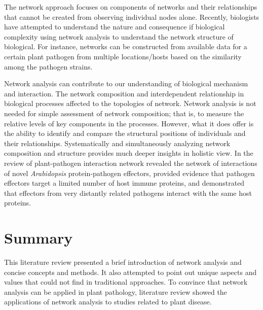 The network approach focuses on components of networks and their relationships that cannot be created from observing individual nodes alone. Recently, biologists have attempted to understand the nature and consequence if biological complexity using network analysis to understand the network structure of biological. For instance, networks can be constructed from available data for a certain plant pathogen from multiple locations/hosts based on the similarity among the pathogen strains.

Network analysis can contribute to our understanding of biological mechanism and interaction. The network composition and interdependent relationship in biological processes affected to the topologies of network. Network analysis is not needed for simple assessment of network composition; that is, to measure the relative levels of key components in the processes. However, what it does offer is the ability to identify and compare the structural positions of individuals and their relationships. Systematically and simultaneously analyzing network composition and structure provides much deeper insights in holistic view. In the review of  plant-pathogen interaction network revealed the network of interactions of novel \textit{Arabidopsis} protein-pathogen effectors, provided evidence that pathogen effectors target a limited number of host immune proteins, and demonstrated that effectors from very distantly related pathogens interact with the same host proteins. 

\section*{Summary}
This literature review presented a brief introduction of network analysis and concise concepts and methods. It also attempted to point out unique aspects and values that could not find in traditional approaches. To convince that network analysis can be applied in plant pathology, literature review showed the applications of network analysis to studies related to plant disease. 

